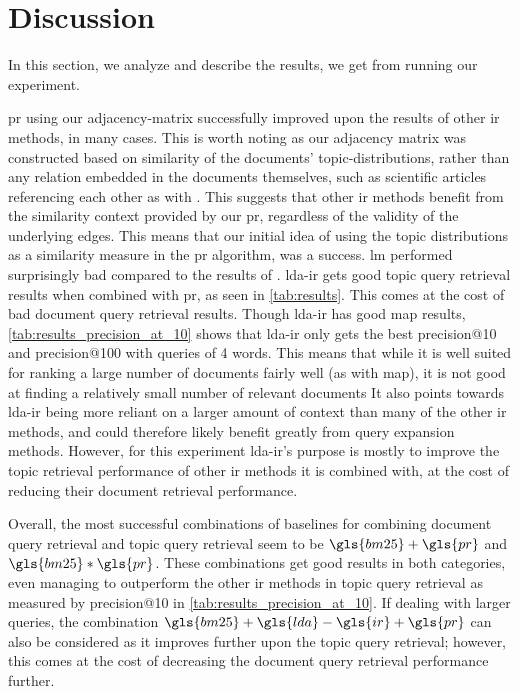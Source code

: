 \section{Discussion}\label{sec:discussion}
In this section, we analyze and describe the results, we get from running our experiment.

\gls{pr} using our adjacency-matrix successfully improved upon the results of other \gls{ir} methods, in many cases.
This is worth noting as our adjacency matrix was constructed based on similarity of the documents' topic-distributions, rather than any relation embedded in the documents themselves, such as scientific articles referencing each other as with \citeauthor{yang2009topic}\cite{yang2009topic}.
This suggests that other \gls{ir} methods benefit from the similarity context provided by our \gls{pr}, regardless of the validity of the underlying edges.
This means that our initial idea of using the topic distributions as a similarity measure in the \gls{pr} algorithm, was a success.
\gls{lm} performed surprisingly bad compared to the results of \cite{yang2009topic}. 
\gls{lda}-\gls{ir} gets good topic query retrieval results when combined with \gls{pr}, as seen in \autoref{tab:results}.
This comes at the cost of bad document query retrieval results.
Though \gls{lda}-\gls{ir} has good \gls{map} results, \autoref{tab:results_precision_at_10} shows that \gls{lda}-\gls{ir} only gets the best precision@10 and precision@100 with queries of 4 words.
This means that while it is well suited for ranking a large number of documents fairly well (as with \gls{map}), it is not good at finding a relatively small number of relevant documents
It also points towards \gls{lda}-\gls{ir} being more reliant on a larger amount of context than many of the other \gls{ir} methods, and could therefore likely benefit greatly from query expansion methods.
However, for this experiment \gls{lda}-\gls{ir}'s purpose is mostly to improve the topic retrieval performance of other \gls{ir} methods it is combined with, at the cost of reducing their document retrieval performance.

Overall, the most successful combinations of baselines for combining document query retrieval and topic query retrieval seem to be $\gls{bm25}+\gls{pr}$ and $\gls{bm25}*\gls{pr}$.
These combinations get good results in both categories, even managing to outperform the other \gls{ir} methods in topic query retrieval as measured by precision@10 in \autoref{tab:results_precision_at_10}.
If dealing with larger queries, the combination $\gls{bm25}+\gls{lda}-\gls{ir}+\gls{pr}$ can also be considered as it improves further upon the topic query retrieval; however, this comes at the cost of decreasing the document query retrieval performance further.
